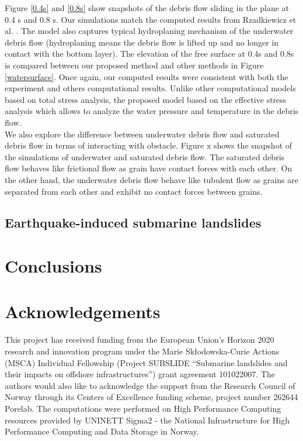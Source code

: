 \documentclass[preprint,12pt]{elsarticle}
\begin{document}
%
%
Figure \ref{0.4s} and  \ref{0.8s} show snapshots of the debris flow sliding in the plane at 0.4 s and 0.8 s. Our simulations match the computed results from Rzadkiewicz et al. \cite{Rzadkiewicz}. The model also captures typical hydroplaning mechanism of the underwater debris flow (hydroplaning means the debris flow is lifted up and no longer in contact with the bottom layer). The elevation of the free surface at 0.4s and 0.8s is compared between our proposed method and other methods in Figure \ref{watersurface}. Once again, our computed results were consistent with both the experiment and others computational results. Unlike other computational models based on total stress analysis, the proposed model based on the effective stress analysis which allows to analyze the water pressure  and temperature in the debris flow.  \\
We also explore the difference between underwater debris flow and saturated debris flow in terms of interacting with obstacle. Figure x shows the snapshot of the simulations of underwater and saturated debris flow. The saturated debris flow behaves like frictional flow as grain have contact forces with each other. On the other hand, the underwater debris flow behave like tubulent flow as grains are separated from each other and exhibit no contact forces between grains.  \\
\subsection{\textsf{Earthquake-induced submarine landslides}}

\section{\textsf{Conclusions}}

\section{\textsf{Acknowledgements}}
This project has received funding from the European Union’s Horizon 2020 research and innovation program under the Marie Skłodowska-Curie Actions (MSCA) Individual Fellowship (Project SUBSLIDE “Submarine landslides and their impacts on offshore infrastructures”) grant agreement 101022007. The authors would also like to acknowledge the support from the Research Council of Norway through its Centers of Excellence funding scheme, project number 262644 Porelab. The computations were performed on High Performance Computing resources provided by UNINETT Sigma2 - the National Infrastructure for High Performance Computing and Data Storage in Norway.
\end{document}
